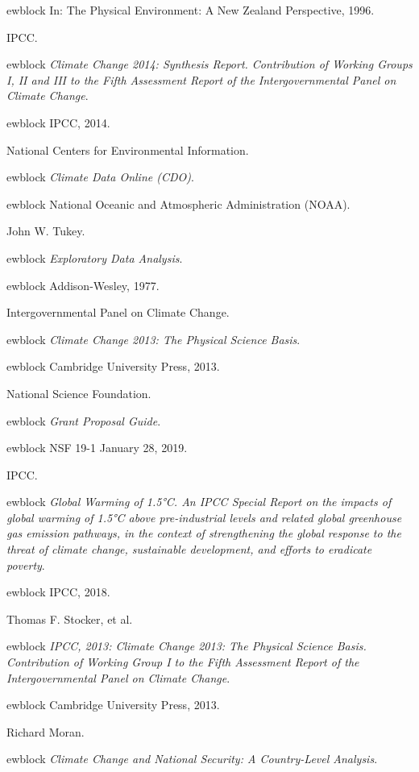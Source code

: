 \documentclass{article}
\begin{document}
\begin{thebibliography}{10}
ewblock In: The Physical Environment: A New Zealand Perspective, 1996.

IPCC.

ewblock {\em Climate Change 2014: Synthesis Report. Contribution of Working Groups I, II and III to the Fifth Assessment Report of the Intergovernmental Panel on Climate Change}.

ewblock IPCC, 2014.

National Centers for Environmental Information.

ewblock {\em Climate Data Online (CDO)}.

ewblock National Oceanic and Atmospheric Administration (NOAA).

John W. Tukey.

ewblock {\em Exploratory Data Analysis}.

ewblock Addison-Wesley, 1977.

Intergovernmental Panel on Climate Change.

ewblock {\em Climate Change 2013: The Physical Science Basis}.

ewblock Cambridge University Press, 2013.

National Science Foundation.

ewblock {\em Grant Proposal Guide}.

ewblock NSF 19-1 January 28, 2019.

IPCC.

ewblock {\em Global Warming of 1.5°C. An IPCC Special Report on the impacts of global warming of 1.5°C above pre-industrial levels and related global greenhouse gas emission pathways, in the context of strengthening the global response to the threat of climate change, sustainable development, and efforts to eradicate poverty}.

ewblock IPCC, 2018.

Thomas F. Stocker, et al.

ewblock {\em IPCC, 2013: Climate Change 2013: The Physical Science Basis. Contribution of Working Group I to the Fifth Assessment Report of the Intergovernmental Panel on Climate Change}.

ewblock Cambridge University Press, 2013.

Richard Moran.

ewblock {\em Climate Change and National Security: A Country-Level Analysis}.


\end{thebibliography}
\end{document}

